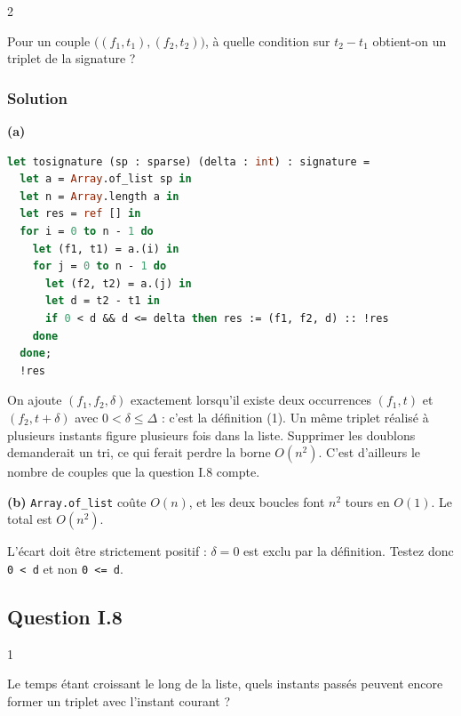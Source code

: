 \documentclass[11pt,a4paper]{article}
\begin{document}
\begin{indication}{2}

Pour un couple \(\big((f_1,t_1),(f_2,t_2)\big)\), à quelle condition sur \(t_2-t_1\) obtient-on un triplet de la signature ?

\end{indication}

\hypertarget{solution-6}{%
\subsubsection{Solution}\label{solution-6}}

\textbf{(a)}

\begin{lstlisting}[language=Caml]
let tosignature (sp : sparse) (delta : int) : signature =
  let a = Array.of_list sp in
  let n = Array.length a in
  let res = ref [] in
  for i = 0 to n - 1 do
    let (f1, t1) = a.(i) in
    for j = 0 to n - 1 do
      let (f2, t2) = a.(j) in
      let d = t2 - t1 in
      if 0 < d && d <= delta then res := (f1, f2, d) :: !res
    done
  done;
  !res
\end{lstlisting}

On ajoute \((f_1,f_2,\delta)\) exactement lorsqu'il existe deux occurrences \((f_1,t)\) et \((f_2,t+\delta)\) avec \(0<\delta\le\Delta\) : c'est la définition (1). Un même triplet réalisé à plusieurs instants figure plusieurs fois dans la liste. Supprimer les doublons demanderait un tri, ce qui ferait perdre la borne \(O(n^2)\). C'est d'ailleurs le nombre de couples que la question I.8 compte.

\textbf{(b)} \texttt{Array.of\_list} coûte \(O(n)\), et les deux boucles font \(n^2\) tours en \(O(1)\). Le total est \(\boxed{O(n^2)}\).

\begin{piege}

L'écart doit être strictement positif : \(\delta=0\) est exclu par la définition. Testez donc \texttt{0\ \textless{}\ d} et non \texttt{0\ \textless{}=\ d}.

\end{piege}

\hypertarget{question-i.8}{%
\subsection{Question I.8}\label{question-i.8}}

\begin{indication}{1}

Le temps étant croissant le long de la liste, quels instants passés peuvent encore former un triplet avec l'instant courant ?

\end{indication}
\end{document}

